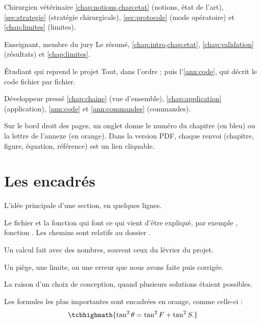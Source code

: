 \documentclass[11pt, a4paper, oneside, openany]{report}
\begin{document}
\begin{tcbraster}[raster columns=2, raster equal height, raster column skip=10pt, raster row skip=10pt,
  raster before skip=0.5em, raster after skip=0.7em]
\begin{carte}{\faUserMd}{Chirurgien vétérinaire}
\cref{chap:notions,chap:etat} (notions, état de l'art), \cref{sec:strategie} (stratégie chirurgicale),
\cref{sec:protocole} (mode opératoire) et \cref{chap:limites} (limites).
\end{carte}
\begin{carte}{\faChalkboardTeacher}{Enseignant, membre du jury}
Le résumé, \cref{chap:intro,chap:etat}, \cref{chap:validation} (résultats) et \cref{chap:limites}.
\end{carte}
\begin{carte}{\faUserGraduate}{Étudiant qui reprend le projet}
Tout, dans l'ordre ; puis l'\cref{ann:code}, qui décrit le code fichier par fichier.
\end{carte}
\begin{carte}{\faLaptopCode}{Développeur pressé}
\cref{chap:chaine} (vue d'ensemble), \cref{chap:application} (application), \cref{ann:code} et
\cref{ann:commandes} (commandes).
\end{carte}
\end{tcbraster}

Sur le bord droit des pages, un onglet donne le numéro du chapitre (en bleu) ou la lettre de l'annexe (en orange).
Dans la version PDF, chaque renvoi (chapitre, figure, équation, référence) est un lien cliquable.

\section*{Les encadrés}

\begin{aretenir}
L'idée principale d'une section, en quelques lignes.
\end{aretenir}
\begin{danslecode}
Le fichier et la fonction qui font ce qui vient d'être expliqué, par exemple ,
fonction . Les chemins sont relatifs au dossier .
\end{danslecode}
\begin{exemple}
Un calcul fait avec des nombres, souvent ceux du lévrier du projet.
\end{exemple}
\begin{attention}
Un piège, une limite, ou une erreur que nous avons faite puis corrigée.
\end{attention}
\begin{pourquoi}
La raison d'un choix de conception, quand plusieurs solutions étaient possibles.
\end{pourquoi}
Les formules les plus importantes sont encadrées en orange, comme celle-ci :
\begin{equation*}
  \tcbhighmath{\tan^2\theta = \tan^2 F + \tan^2 S.}
\end{equation*}
\end{document}
